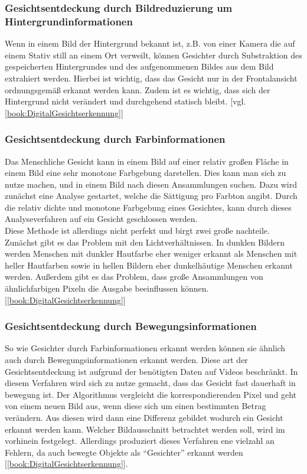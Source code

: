         \subsubsection{Gesichtsentdeckung durch Bildreduzierung um Hintergrundinformationen}
        \label{subsubsec:face_detection_bildreduzierung_um_hintergrundinformationen}
            Wenn in einem Bild der Hintergrund bekannt ist, z.B. von einer Kamera die auf einem Stativ still an einem Ort verweilt, können Gesichter durch Substraktion des gespeicherten Hintergrundes und des aufgenommenen Bildes aus dem Bild extrahiert werden. Hierbei ist wichtig, dass das Gesicht nur in der Frontalansicht ordnungsgemäß erkannt werden kann. Zudem ist es wichtig, dass sich der Hintergrund nicht verändert und durchgehend statisch bleibt. [vgl. \ref{book:DigitalGesichtserkennung}]
        
        \subsubsection{Gesichtsentdeckung durch Farbinformationen}
        \label{subsubsec:face_detection_with_color_information}
            Das Menschliche Gesicht kann in einem Bild auf einer relativ großen Fläche in einem Bild eine sehr monotone Farbgebung darstellen. Dies kann man sich zu nutze machen, und in einem Bild nach diesen Ansammlungen suchen. Dazu wird zunächst eine Analyse gestartet, welche die Sättigung pro Farbton angibt. Durch die relativ dichte und monotone Farbgebung eines Gesichtes, kann durch dieses Analyseverfahren auf ein Gesicht geschlossen werden.\\
            Diese Methode ist allerdings nicht perfekt und birgt zwei große nachteile. Zunächst gibt es das Problem mit den Lichtverhältnissen. In dunklen Bildern werden Menschen mit dunkler Hautfarbe eher weniger erkannt als Menschen mit heller Hautfarben sowie in hellen Bildern eher dunkelhäutige Menschen erkannt werden. Außerdem gibt es das Problem, dass große Ansammlungen von ähnlichfarbigen Pixeln die Ausgabe beeinflussen können. [\ref{book:DigitalGesichtserkennung}]

        \subsubsection{Gesichtsentdeckung durch Bewegungsinformationen}
        \label{subsubsec:face_detection_durch_bewegungsinformationen}
            So wie Gesichter durch Farbinformationen erkannt werden können sie ähnlich auch durch Bewegungsinformationen erkannt werden. Diese art der Gesichtsentdeckung ist aufgrund der benötigten Daten auf Videos beschränkt. In diesem Verfahren wird sich zu nutze gemacht, dass das Gesicht fast dauerhaft in bewegung ist. Der Algorithmus vergleicht die korrespondierenden Pixel und geht von einem neuen Bild aus, wenn diese sich um einen bestimmten Betrag verändern. Aus diesen wird dann eine Differenz gebildet wodurch ein Gesicht erkannt werden kann. Welcher Bildausschnitt betrachtet werden soll, wird im vorhinein festgelegt. Allerdings produziert dieses Verfahren ene vielzahl an Fehlern, da auch bewegte Objekte als \enquote{Gesichter} erkannt werden [\ref{book:DigitalGesichtserkennung}].

